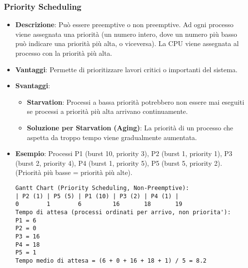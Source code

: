 \subsubsection{Priority Scheduling}
\begin{itemize}
    \item \textbf{Descrizione}: Può essere preemptive o non preemptive. Ad ogni processo viene assegnata una priorità (un numero intero, dove un numero più basso può indicare una priorità più alta, o viceversa). La CPU viene assegnata al processo con la priorità più alta.
    \item \textbf{Vantaggi}: Permette di prioritizzare lavori critici o importanti del sistema.
    \item \textbf{Svantaggi}:
    \begin{itemize}
        \item \textbf{Starvation}: Processi a bassa priorità potrebbero non essere mai eseguiti se processi a priorità più alta arrivano continuamente.
        \item \textbf{Soluzione per Starvation (Aging)}: La priorità di un processo che aspetta da troppo tempo viene gradualmente aumentata.
    \end{itemize}
    \item \textbf{Esempio}: Processi P1 (burst 10, priority 3), P2 (burst 1, priority 1), P3 (burst 2, priority 4), P4 (burst 1, priority 5), P5 (burst 5, priority 2). (Priorità più basse = priorità più alte).
    \begin{lstlisting}[numbers=none, language=Pseudocode]
Gantt Chart (Priority Scheduling, Non-Preemptive):
| P2 (1) | P5 (5) | P1 (10) | P3 (2) | P4 (1) |
0        1        6         16       18       19
Tempo di attesa (processi ordinati per arrivo, non priorita'):
P1 = 6
P2 = 0
P3 = 16
P4 = 18
P5 = 1
Tempo medio di attesa = (6 + 0 + 16 + 18 + 1) / 5 = 8.2
    \end{lstlisting}
\end{itemize}

